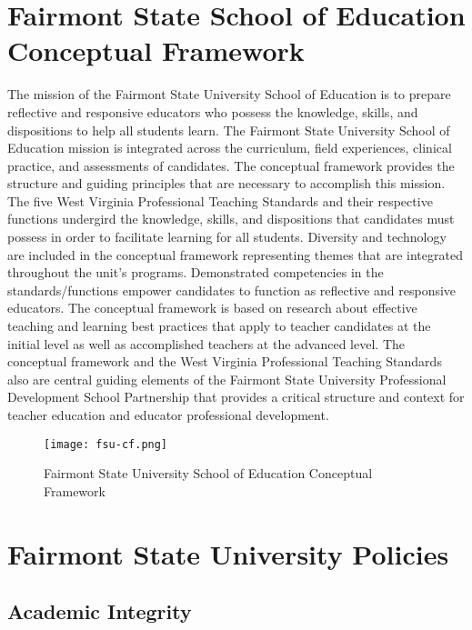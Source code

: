 \section{Fairmont State School of Education Conceptual Framework}
The mission of the Fairmont State University School of Education is to prepare reflective and responsive educators who possess the knowledge, skills, and dispositions to help all students learn. The Fairmont State University School of Education mission is integrated across the curriculum, field experiences, clinical practice, and assessments of candidates. The conceptual framework provides the structure and guiding principles that are necessary to accomplish this mission. The five West Virginia Professional Teaching Standards and their respective functions undergird the knowledge, skills, and dispositions that candidates must possess in order to facilitate learning for all students. Diversity and technology are included in the conceptual framework representing themes that are integrated throughout the unit's programs. Demonstrated competencies in the standards/functions empower candidates to function as reflective and responsive educators. The conceptual framework is based on research about effective teaching and learning best practices that apply to teacher candidates at the initial level as well as accomplished teachers at the advanced level. The conceptual framework and the West Virginia Professional Teaching Standards also are central guiding elements of the Fairmont State University Professional Development School Partnership that provides a critical structure and context for teacher education and educator professional development.

\begin{center}
\begin{figure}%
  \centerline{\texttt{[image: fsu-cf.png]}}
  \caption{Fairmont State University School of Education Conceptual Framework}
  \label{fig:fsu-cf}
\end{figure}
\end{center}

\section{Fairmont State University Policies}

\subsection{Academic Integrity}

